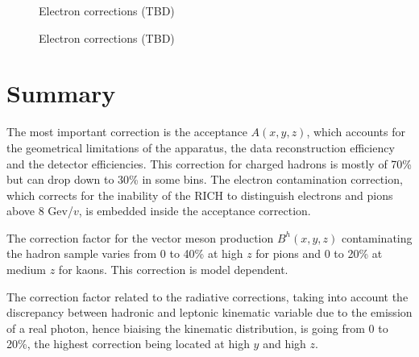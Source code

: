 \begin{figure}[!h]
	\caption{Electron corrections (TBD)}
	\label{pic:ehad}
\end{figure}

\begin{figure}[!h]
	\caption{Electron corrections (TBD)}
	\label{pic:epi}
\end{figure}

\section{Summary}

The most important correction is the acceptance $A(x,y,z)$, which accounts for the geometrical limitations of the apparatus, the data reconstruction efficiency and the detector efficiencies. This correction for charged hadrons is mostly of 70\% but can drop down to 30\% in some bins. The electron contamination correction, which corrects for the inability of the RICH to distinguish electrons and pions above 8 Gev/$v$, is embedded inside the acceptance correction.

The correction factor for the vector meson production $B^h(x,y,z)$ contaminating the hadron sample varies from 0 to 40\% at high $z$ for pions and 0 to 20\% at medium $z$ for kaons. This correction is model dependent.

The correction factor related to the radiative corrections, taking into account the discrepancy between hadronic and leptonic kinematic variable due to the emission of a real photon, hence biaising the kinematic distribution, is going from 0 to 20\%, the highest correction being located at high $y$ and high $z$.
